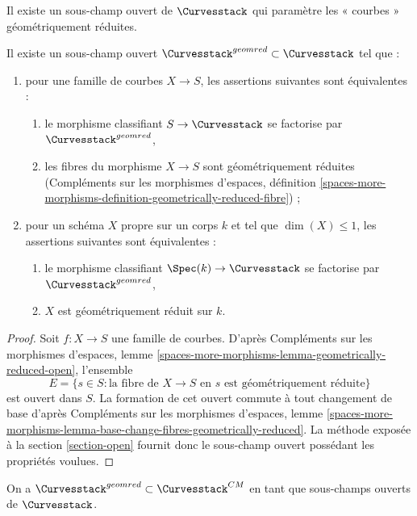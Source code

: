 \noindent
Il existe un sous-champ ouvert de $\Curvesstack$ qui paramètre
les « courbes » géométriquement réduites.

\begin{lemma}
\label{lemma-geometrically-reduced-curves}
Il existe un sous-champ ouvert $\Curvesstack^{geomred} \subset \Curvesstack$
tel que :
\begin{enumerate}
\item pour une famille de courbes $X \to S$, les assertions suivantes
sont équivalentes :
\begin{enumerate}
\item le morphisme classifiant $S \to \Curvesstack$ se factorise par
$\Curvesstack^{geomred}$,
\item les fibres du morphisme $X \to S$ sont géométriquement réduites
(Compléments sur les morphismes d'espaces, définition
\ref{spaces-more-morphisms-definition-geometrically-reduced-fibre}) ;
\end{enumerate}
\item pour un schéma $X$ propre sur un corps $k$ et tel que $\dim(X) \leq 1$,
les assertions suivantes sont équivalentes :
\begin{enumerate}
\item le morphisme classifiant $\Spec(k) \to \Curvesstack$ se factorise par
$\Curvesstack^{geomred}$,
\item $X$ est géométriquement réduit sur $k$.
\end{enumerate}
\end{enumerate}
\end{lemma}

\begin{proof}
Soit $f : X \to S$ une famille de courbes. D'après
Compléments sur les morphismes d'espaces, lemme
\ref{spaces-more-morphisms-lemma-geometrically-reduced-open},
l'ensemble
$$
E = \{s \in S : \text{la fibre de }X \to S\text{ en }s
\text{ est géométriquement réduite}\}
$$
est ouvert dans $S$. La formation de cet ouvert commute à tout
changement de base d'après
Compléments sur les morphismes d'espaces, lemme
\ref{spaces-more-morphisms-lemma-base-change-fibres-geometrically-reduced}.
La méthode exposée à la section \ref{section-open} fournit donc le sous-champ
ouvert possédant les propriétés voulues.
\end{proof}

\begin{lemma}
\label{lemma-geomred-in-CM}
On a $\Curvesstack^{geomred} \subset \Curvesstack^{CM}$
en tant que sous-champs ouverts de $\Curvesstack$.
\end{lemma}

